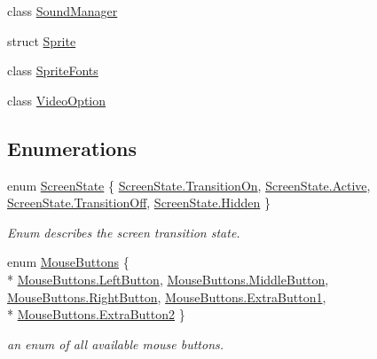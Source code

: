 \begin{DoxyCompactItemize}
class \hyperlink{classgearit_1_1xna_1_1_sound_manager}{Sound\+Manager}
\item 
struct \hyperlink{structgearit_1_1xna_1_1_sprite}{Sprite}
\item 
class \hyperlink{classgearit_1_1xna_1_1_sprite_fonts}{Sprite\+Fonts}
\item 
class \hyperlink{classgearit_1_1xna_1_1_video_option}{Video\+Option}
\end{DoxyCompactItemize}
\subsection*{Enumerations}
\begin{DoxyCompactItemize}
\item 
enum \hyperlink{namespacegearit_1_1xna_a31b84963a73312899ecc8b0684c41d9e}{Screen\+State} \{ \hyperlink{namespacegearit_1_1xna_a31b84963a73312899ecc8b0684c41d9eada75f3f095c9aef3184de03832b831c8}{Screen\+State.\+Transition\+On}, 
\hyperlink{namespacegearit_1_1xna_a31b84963a73312899ecc8b0684c41d9ea4d3d769b812b6faa6b76e1a8abaece2d}{Screen\+State.\+Active}, 
\hyperlink{namespacegearit_1_1xna_a31b84963a73312899ecc8b0684c41d9ead5585781c02f0dff7531081980ecbfce}{Screen\+State.\+Transition\+Off}, 
\hyperlink{namespacegearit_1_1xna_a31b84963a73312899ecc8b0684c41d9ea7acdf85c69cc3c5305456a293524386e}{Screen\+State.\+Hidden}
 \}
\begin{DoxyCompactList}\small\item\em Enum describes the screen transition state. \end{DoxyCompactList}\item 
enum \hyperlink{namespacegearit_1_1xna_a41534985797a7c3fd3cad9ed9543d57b}{Mouse\+Buttons} \{ \\*
\hyperlink{namespacegearit_1_1xna_a41534985797a7c3fd3cad9ed9543d57ba2a81c1ce439d7652d7a61d55229c8043}{Mouse\+Buttons.\+Left\+Button}, 
\hyperlink{namespacegearit_1_1xna_a41534985797a7c3fd3cad9ed9543d57baa196f1ff95059e191270f3bb6ab4a266}{Mouse\+Buttons.\+Middle\+Button}, 
\hyperlink{namespacegearit_1_1xna_a41534985797a7c3fd3cad9ed9543d57ba7e264b46aade8e083656f1f0897220f3}{Mouse\+Buttons.\+Right\+Button}, 
\hyperlink{namespacegearit_1_1xna_a41534985797a7c3fd3cad9ed9543d57ba0661d54759215c0d1a549e9efb534deb}{Mouse\+Buttons.\+Extra\+Button1}, 
\\*
\hyperlink{namespacegearit_1_1xna_a41534985797a7c3fd3cad9ed9543d57ba34f1ffec6b891cfa18296241c7b53434}{Mouse\+Buttons.\+Extra\+Button2}
 \}
\begin{DoxyCompactList}\small\item\em an enum of all available mouse buttons. \end{DoxyCompactList}\item 

\end{DoxyCompactItemize}
